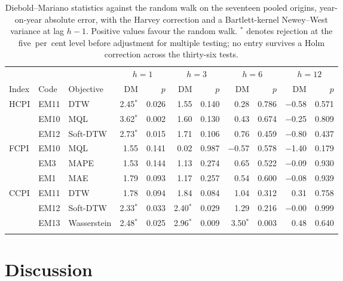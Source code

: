 \documentclass[12pt]{article}
\begin{document}
\begin{table}[htbp]\centering
\caption{Diebold--Mariano statistics against the random walk on the seventeen pooled origins, year-on-year absolute error, with the Harvey correction and a Bartlett-kernel Newey--West variance at lag $h-1$. Positive values favour the random walk. $^{*}$ denotes rejection at the five~per~cent level before adjustment for multiple testing; no entry survives a Holm correction across the thirty-six tests.}
\label{tab:dm17}
\begin{threeparttable}\scriptsize\setlength{\tabcolsep}{3pt}
\begin{tabular}{@{}l l l rr rr rr rr@{}}
\toprule
 & & & \multicolumn{2}{c}{$h=1$} & \multicolumn{2}{c}{$h=3$} & \multicolumn{2}{c}{$h=6$} & \multicolumn{2}{c}{$h=12$} \\
\cmidrule(lr){4-5}\cmidrule(lr){6-7}\cmidrule(lr){8-9}\cmidrule(lr){10-11}
Index & Code & Objective & DM & $p$ & DM & $p$ & DM & $p$ & DM & $p$ \\
\midrule
HCPI & EM11 & DTW & 2.45$^{*}$ & 0.026 & 1.55 & 0.140 & 0.28 & 0.786 & $-$0.58 & 0.571 \\
 & EM10 & MQL & 3.62$^{*}$ & 0.002 & 1.60 & 0.130 & 0.43 & 0.674 & $-$0.25 & 0.809 \\
 & EM12 & Soft-DTW & 2.73$^{*}$ & 0.015 & 1.71 & 0.106 & 0.76 & 0.459 & $-$0.80 & 0.437 \\
\addlinespace[2pt]
FCPI & EM10 & MQL & 1.55 & 0.141 & 0.02 & 0.987 & $-$0.57 & 0.578 & $-$1.40 & 0.179 \\
 & EM3 & MAPE & 1.53 & 0.144 & 1.13 & 0.274 & 0.65 & 0.522 & $-$0.09 & 0.930 \\
 & EM1 & MAE & 1.79 & 0.093 & 1.17 & 0.257 & 0.54 & 0.600 & $-$0.08 & 0.939 \\
\addlinespace[2pt]
CCPI & EM11 & DTW & 1.78 & 0.094 & 1.84 & 0.084 & 1.04 & 0.312 & 0.31 & 0.758 \\
 & EM12 & Soft-DTW & 2.33$^{*}$ & 0.033 & 2.40$^{*}$ & 0.029 & 1.29 & 0.216 & $-$0.00 & 0.999 \\
 & EM13 & Wasserstein & 2.48$^{*}$ & 0.025 & 2.96$^{*}$ & 0.009 & 3.50$^{*}$ & 0.003 & 0.48 & 0.640 \\
\addlinespace[2pt]
\bottomrule
\end{tabular}
\end{threeparttable}\end{table}

\section{Discussion}
\label{sec:discussion}
\end{document}
